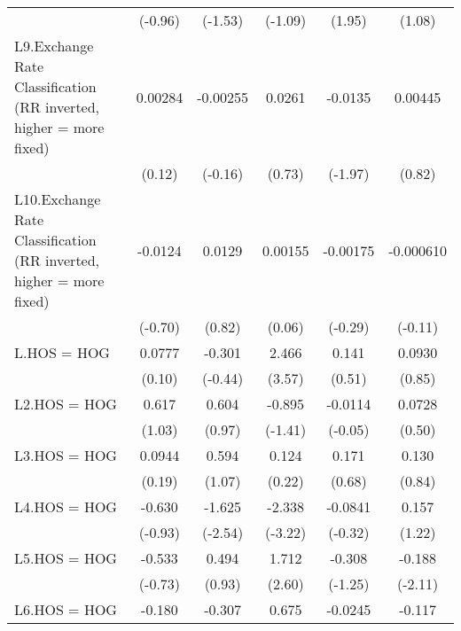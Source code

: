 {\begin{tabular}{l*{5}{c}}
                &  (-0.96)         &  (-1.53)         &  (-1.09)         &   (1.95)         &   (1.08)         \\
[1em]
L9.Exchange Rate Classification (RR inverted, higher = more fixed)&  0.00284         & -0.00255         &   0.0261         &  -0.0135         &  0.00445         \\
                &   (0.12)         &  (-0.16)         &   (0.73)         &  (-1.97)         &   (0.82)         \\
[1em]
L10.Exchange Rate Classification (RR inverted, higher = more fixed)&  -0.0124         &   0.0129         &  0.00155         & -0.00175         &-0.000610         \\
                &  (-0.70)         &   (0.82)         &   (0.06)         &  (-0.29)         &  (-0.11)         \\
[1em]
L.HOS = HOG     &   0.0777         &   -0.301         &    2.466\sym{***}&    0.141         &   0.0930         \\
                &   (0.10)         &  (-0.44)         &   (3.57)         &   (0.51)         &   (0.85)         \\
[1em]
L2.HOS = HOG    &    0.617         &    0.604         &   -0.895         &  -0.0114         &   0.0728         \\
                &   (1.03)         &   (0.97)         &  (-1.41)         &  (-0.05)         &   (0.50)         \\
[1em]
L3.HOS = HOG    &   0.0944         &    0.594         &    0.124         &    0.171         &    0.130         \\
                &   (0.19)         &   (1.07)         &   (0.22)         &   (0.68)         &   (0.84)         \\
[1em]
L4.HOS = HOG    &   -0.630         &   -1.625\sym{*}  &   -2.338\sym{**} &  -0.0841         &    0.157         \\
                &  (-0.93)         &  (-2.54)         &  (-3.22)         &  (-0.32)         &   (1.22)         \\
[1em]
L5.HOS = HOG    &   -0.533         &    0.494         &    1.712\sym{*}  &   -0.308         &   -0.188\sym{*}  \\
                &  (-0.73)         &   (0.93)         &   (2.60)         &  (-1.25)         &  (-2.11)         \\
[1em]
L6.HOS = HOG    &   -0.180         &   -0.307         &    0.675         &  -0.0245         &   -0.117         \\

\end{tabular}}
